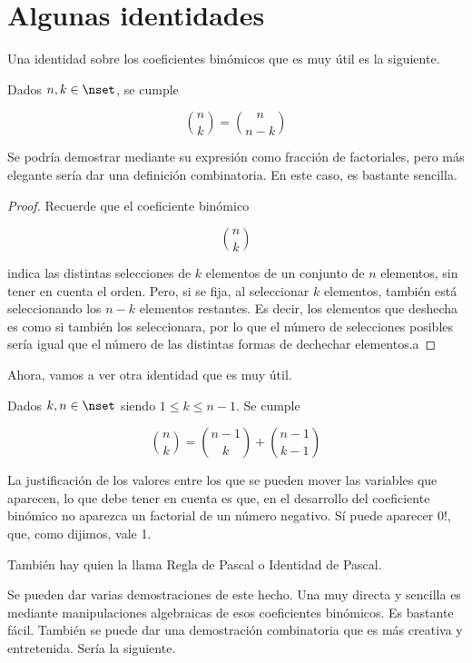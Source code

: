 




\section{Algunas identidades}

Una identidad sobre los coeficientes binómicos que es muy útil es la
siguiente.

\begin{proposition}
  Dados $n, k \in \nset$, se cumple

  $$ {n \choose k} = {n \choose n-k} $$
\end{proposition}

Se podría demostrar mediante su expresión como fracción de factoriales, pero
más elegante sería dar una definición combinatoria. En este caso, es
bastante sencilla.

\begin{proof}
  Recuerde que el coeficiente binómico

  $$ {n \choose k} $$

  \noindent indica las distintas selecciones de $k$ elementos de un conjunto
  de $n$ elementos, sin tener en cuenta el orden. Pero, si se fija, al
  seleccionar $k$ elementos, también está seleccionando los $n-k$ elementos
  restantes. Es decir, los elementos que deshecha es como si también los
  seleccionara, por lo que el número de selecciones posibles sería igual que
  el número de las distintas formas de dechechar elementos.a
\end{proof}

Ahora, vamos a ver otra identidad que es muy útil.

\begin{proposition}
  Dados $k, n \in \nset$ siendo $1 \leq k \leq n-1$. Se cumple

  $$ {n \choose k} = {n-1 \choose k} + {n-1 \choose k-1} $$
\end{proposition}

La justificación de los valores entre los que se pueden mover las variables
que aparecen, lo que debe tener en cuenta es que, en el desarrollo del
coeficiente binómico no aparezca un factorial de un número negativo. Sí
puede aparecer $0!$, que, como dijimos, vale 1.

También hay quien la llama Regla de Pascal o Identidad de Pascal.

Se pueden dar varias demostraciones de este hecho. Una muy directa y
sencilla es mediante manipulaciones algebraicas de esos coeficientes
binómicos. Es bastante fácil. También se puede dar una demostración
combinatoria que es más creativa y entretenida. Sería la siguiente.

